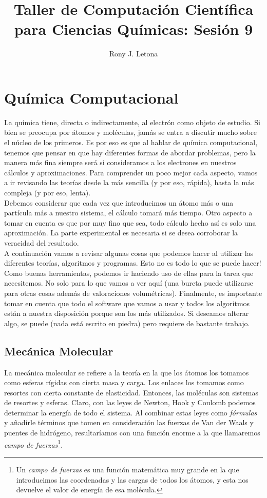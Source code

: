 \documentclass[10pt,letterpaper]{article}
\author{Rony J. Letona}
\title{Taller de Computaci\'on Cient\'ifica para Ciencias Qu\'imicas: Sesi\'on 9}
\begin{document}
\maketitle

\section{Qu\'imica Computacional}
La qu\'imica tiene, directa o indirectamente, al electr\'on como objeto de estudio. Si bien se preocupa por \'atomos y mol\'eculas, jam\'as se entra a discutir mucho sobre el n\'ucleo de los primeros. Es por eso es que al hablar de qu\'imica computacional, tenemos que pensar en que hay diferentes formas de abordar problemas, pero la manera m\'as fina siempre ser\'a si consideramos a los electrones en nuestros c\'alculos y aproximaciones. Para comprender un poco mejor cada aspecto, vamos a ir revisando las teor\'ias desde la m\'as sencilla (y por eso, r\'apida), hasta la m\'as compleja (y por eso, lenta).\\

Debemos considerar que cada vez que introducimos un \'atomo m\'as o una part\'icula m\'as a nuestro sistema, el c\'alculo tomar\'a m\'as tiempo. Otro aspecto a tomar en cuenta es que por muy fino que sea, todo c\'alculo hecho as\'i es solo una aproximaci\'on. La parte experimental es necesaria si se desea corroborar la veracidad del resultado.\\

A continuaci\'on vamos a revisar algunas cosas que podemos hacer al utilizar las diferentes teor\'ias, algoritmos y programas. Esto no es todo lo que se puede hacer! Como buenas herramientas, podemos ir haciendo uso de ellas para la tarea que necesitemos. No solo para lo que vamos a ver aqu\'i (una bureta puede utilizarse para otras cosas adem\'as de valoraciones volum\'etricas). Finalmente, es importante tomar en cuenta que todo el software que vamos a usar y todos los algoritmos est\'an a nuestra disposici\'on porque son los m\'as utilizados. Si deseamos alterar algo, se puede (nada est\'a escrito en piedra) pero requiere de bastante trabajo.

\subsection{Mec\'anica Molecular}
La mec\'anica molecular se refiere a la teor\'ia en la que los \'atomos los tomamos como esferas r\'igidas con cierta masa y carga. Los enlaces los tomamos como resortes con cierta constante de elasticidad. Entonces, las mol\'eculas son sistemas de resortes y esferas. Claro, con las leyes de Newton, Hook y Coulomb podemos determinar la energ\'ia de todo el sistema. Al combinar estas leyes como \emph{f\'ormulas} y a\~nadirle t\'erminos que tomen en consideraci\'on las fuerzas de Van der Waals y puentes de hidr\'ogeno, resultar\'iamos con una funci\'on enorme a la que llamaremos \emph{campo de fuerzas}\footnote{Un \emph{campo de fuerzas} es una funci\'on matem\'atica muy grande en la que introducimos las coordenadas y las cargas de todos los \'atomos, y esta nos devuelve el valor de energ\'ia de esa mol\'ecula.}.\\
\end{document}

